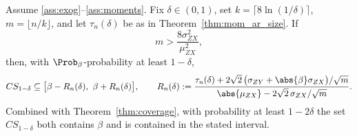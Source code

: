\begin{proposition}
\label{prop:cs_localisation}
Assume \ref{ass:exog}--\ref{ass:moments}. Fix $\delta\in(0,1)$, set $k=\lceil 8\ln(1/\delta)\rceil$, $m=\lfloor n/k\rfloor$, and let $\tau_n(\delta)$ be as in Theorem~\ref{thm:mom_ar_size}. If
\begin{equation}
  m > \frac{8\sigma_{ZX}^2}{\mu_{ZX}^2},
  \label{eq:local_strength}
\end{equation}
then, with $\Prob_\beta$-probability at least $1-\delta$,
\begin{equation}
  CS_{1-\delta} \subseteq \bigl[\beta - R_n(\delta),\ \beta + R_n(\delta)\bigr],
  \qquad
  R_n(\delta) := \frac{\tau_n(\delta) + 2\sqrt{2}\,\bigl(\sigma_{ZY} + \abs{\beta}\sigma_{ZX}\bigr)/\sqrt{m}}{\abs{\mu_{ZX}} - 2\sqrt{2}\,\sigma_{ZX}/\sqrt{m}}.
  \label{eq:cs_radius}
\end{equation}
Combined with Theorem~\ref{thm:coverage}, with probability at least $1-2\delta$ the set $CS_{1-\delta}$ both contains $\beta$ and is contained in the stated interval.
\end{proposition}

